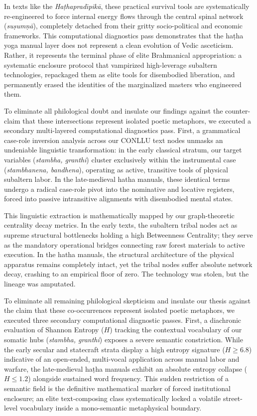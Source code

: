 \documentclass[11pt,twoside,letterpaper]{article}
\begin{document}
In texts like the \textit{Ha\d{t}haprad\={\i}pik\={a}}, these practical survival tools are systematically re-engineered to force internal energy flows through the central spinal network (\textit{su\d{s}um\d{n}\={a}}), completely detached from their gritty socio-political and economic frameworks. This computational diagnostics pass demonstrates that the ha\d{t}ha yoga manual layer does not represent a clean evolution of Vedic asceticism. Rather, it represents the terminal phase of elite Brahmanical appropriation: a systematic enclosure protocol that vampirized high-leverage subaltern technologies, repackaged them as elite tools for disembodied liberation, and permanently erased the identities of the marginalized masters who engineered them.

To eliminate all philological doubt and insulate our findings against the counter-claim that these intersections represent isolated poetic metaphors, we executed a secondary multi-layered computational diagnostics pass. First, a grammatical case-role inversion analysis across our CONLLU text nodes unmasks an undeniable linguistic transformation: in the early classical stratum, our target variables (\textit{stambha, granthi}) cluster exclusively within the instrumental case (\textit{stambhanena, bandhena}), operating as active, transitive tools of physical subaltern labor. In the late-medieval hatha manuals, these identical terms undergo a radical case-role pivot into the nominative and locative registers, forced into passive intransitive alignments with disembodied mental states. 

This linguistic extraction is mathematically mapped by our graph-theoretic centrality decay metrics. In the early texts, the subaltern tribal nodes act as supreme structural bottlenecks holding a high Betweenness Centrality; they serve as the mandatory operational bridges connecting raw forest materials to active execution. In the hatha manuals, the structural architecture of the physical apparatus remains completely intact, yet the tribal nodes suffer absolute network decay, crashing to an empirical floor of zero. The technology was stolen, but the lineage was amputated. 

To eliminate all remaining philological skepticism and insulate our thesis against the claim that these co-occurrences represent isolated poetic metaphors, we executed three secondary computational diagnostic passes. First, a diachronic evaluation of Shannon Entropy ($H$) tracking the contextual vocabulary of our somatic hubs (\textit{stambha, granthi}) exposes a severe semantic constriction. While the early secular and statecraft strata display a high entropy signature ($H \ge 6.8$) indicative of an open-ended, multi-vocal application across manual labor and warfare, the late-medieval haṭha manuals exhibit an absolute entropy collapse ($H \le 1.2$) alongside sustained word frequency. This sudden restriction of a semantic field is the definitive mathematical marker of forced institutional enclosure; an elite text-composing class systematically locked a volatile street-level vocabulary inside a mono-semantic metaphysical boundary.
\end{document}
